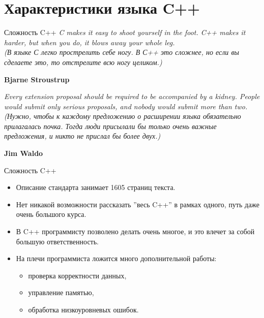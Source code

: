 \documentclass[
    9pt,
    hyperref={pdfencoding=unicode}
    ]{beamer}
\begin{document}
\section{Характеристики языка C++}
\begin{frame}{Сложность C++}
    \textit{C makes it easy to shoot yourself in the foot. C++ makes it harder,
    but when you do, it blows away your whole leg.\\
    (В языке С легко прострелить себе ногу. В С++ это сложнее, но
    если вы сделаете это, то отстрелите всю ногу целиком.)}
    \begin{flushright}
        \textbf{Bjarne Stroustrup}
    \end{flushright}
    \vspace{2em}
    
   \textit{ Every extension proposal should be required to be accompanied by
    a kidney. People would submit only serious proposals, and nobody
    would submit more than two.\\
    (Нужно, чтобы к каждому предложению о расширении языка
    обязательно прилагалась почка. Тогда люди присылали бы
    только очень важные предложения, и никто не прислал бы
    более двух.)}
    \begin{flushright}
        \textbf{Jim Waldo}
    \end{flushright}
\end{frame}
\begin{frame}{Сложность C++}
    \begin{itemize}
        \item Описание стандарта занимает 1605 страниц текста.
        \item Нет никакой возможности рассказать ”весь C++” в рамках
        одного, путь даже очень большого курса.
        \item В C++ программисту позволено делать очень многое, и это
        влечет за собой большую ответственность.
        \item На плечи программиста ложится много дополнительной
        работы:
        \begin{itemize}
            \item проверка корректности данных,
            \item управление памятью,
            \item обработка низкоуровневых ошибок.
        \end{itemize}        
    \end{itemize}
\end{frame}
\end{document}
